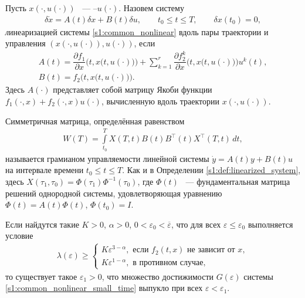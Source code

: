\documentclass[../abstract.tex]{subfiles}
\begin{document}
\begin{definition}\label{s1:def:linearized_system}
	Пусть $ x(\cdot,u(\cdot)) $ ~--- --$ u(\cdot)$.
	Назовем систему
	\begin{gather}\label{s1:linearized_system}
		\delta \dot{x} = A(t) \delta x + B(t) \delta u, \qquad t_0 \leqslant t \leqslant T, \qquad \delta x(t_0) = 0,
	\end{gather}
	{\textit линеаризацией} системы \eqref{s1:common_nonlinear} вдоль пары траектории и управления $\left( x(\cdot,u(\cdot)),u(\cdot)\right) $, если 
	\begin{gather*}
		A(t) = \dfrac{\partial f_1}{\partial x} \Big(t,x\big(t,u(\cdot)\big)\Big) 
		+ 
		\sum\limits_{k = 1}^{r}
		\dfrac{\partial f_2^k}{\partial x}\Big(t,x\big(t,u(\cdot)\big)\Big) u^k(t), \\
		B(t) = f_2 \Big(t,x\big(t,u(\cdot)\big)\Big).
	\end{gather*}
	Здесь $ A(\cdot) $ представляет собой матрицу Якоби функции $ f_1(\cdot, x) + f_2(\cdot, x) u(\cdot) $, вычисленную вдоль траектории $ x(\cdot,u(\cdot)) $.
\end{definition}

\begin{definition}\label{s1:def:grammian}
	Симметричная матрица, определённая равенством
	\begin{gather*}
		W(T) = \int\limits_{t_0}^{T}X(T,t)B(t)B^{\top}(t)X^{\top}(T,t) \, dt,
	\end{gather*}
	называется грамианом управляемости линейной системы $\dot{y} = A(t) y + B(t) u $ на интервале времени $ t_0 \leqslant t \leqslant T $.
	Как и в Определении \ref{s1:def:linearized_system}, здесь $ X(\tau_1,\tau_0)= \Phi(\tau_1) \Phi^{-1}(\tau_0) $, где $\Phi(t) $ ~--- фундаментальная матрица решений однородной системы, удовлетворяющая уравнению $ \dot{\Phi}(t) = A(t) \Phi(t)$, $ \Phi(t_0) = I $.
\end{definition}
\begin{theorem}\label{s1:th:small_time_convexity}
	Если найдутся такие $K > 0$, $ \alpha > 0$, $ 0 < \varepsilon_0 < \overline{\varepsilon}$, что для всех $\varepsilon \leqslant \varepsilon_0$ выполняется условие
	\begin{gather}\label{s1:small_time_convexity_condition}
		\lambda(\varepsilon) \geqslant \left\{ {\begin{array}{*{20}{l}}
				{K\varepsilon ^{3 - \alpha}, \mbox{\ если \ } f_2(t,x) \mbox{\ не зависит от \ } x}, \\
				{K\varepsilon ^{1 - \alpha}}, \mbox{\ в противном случае},
		\end{array}} \right.
	\end{gather}
	то существует такое $ \varepsilon_1 > 0 $, что множество достижимости $G(\varepsilon)$ системы \eqref{s1:common_nonlinear_small_time} выпукло при всех $\varepsilon < \varepsilon_1 $.
\end{theorem}
		
\end{document}
